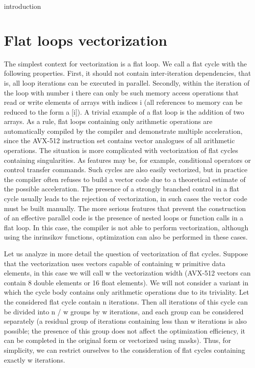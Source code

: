 \documentclass[
11pt,%
tightenlines,%
twoside,%
onecolumn,%
nofloats,%
nobibnotes,%
nofootinbib,%
superscriptaddress,%
noshowpacs,%
centertags]%
{revtex4}
\begin{document}
introduction

\section{Flat loops vectorization}

The simplest context for vectorization is a flat loop. We call a flat cycle with the following properties. First, it should not contain inter-iteration dependencies, that is, all loop iterations can be executed in parallel. Secondly, within the iteration of the loop with number i there can only be such memory access operations that read or write elements of arrays with indices i (all references to memory can be reduced to the form a [i]). A trivial example of a flat loop is the addition of two arrays. As a rule, flat loops containing only arithmetic operations are automatically compiled by the compiler and demonstrate multiple acceleration, since the AVX-512 instruction set contains vector analogues of all arithmetic operations. The situation is more complicated with vectorization of flat cycles containing singularities. As features may be, for example, conditional operators or control transfer commands. Such cycles are also easily vectorized, but in practice the compiler often refuses to build a vector code due to a theoretical estimate of the possible acceleration. The presence of a strongly branched control in a flat cycle usually leads to the rejection of vectorization, in such cases the vector code must be built manually. The more serious features that prevent the construction of an effective parallel code is the presence of nested loops or function calls in a flat loop. In this case, the compiler is not able to perform vectorization, although using the inrinsikov functions, optimization can also be performed in these cases.

Let us analyze in more detail the question of vectorization of flat cycles. Suppose that the vectorization uses vectors capable of containing w primitive data elements, in this case we will call w the vectorization width (AVX-512 vectors can contain 8 double elements or 16 float elements). We will not consider a variant in which the cycle body contains only arithmetic operations due to its triviality. Let the considered flat cycle contain n iterations. Then all iterations of this cycle can be divided into n / w groups by w iterations, and each group can be considered separately (a residual group of iterations containing less than w iterations is also possible; the presence of this group does not affect the optimization efficiency, it can be completed in the original form or vectorized using masks). Thus, for simplicity, we can restrict ourselves to the consideration of flat cycles containing exactly w iterations.
\end{document}
